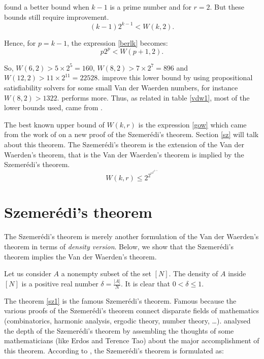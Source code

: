 \cite{brk1968} found a better bound when $k-1$ is a prime number  and for $r=2$. But these bounds still  require improvement. 
 \begin{equation}
 (k-1)2^{k-1}<W(k,2). \label{berlk}
 \end{equation}

Hence, for $p=k-1$, the expression \eqref{berlk} becomes:
 \begin{equation}
 p2^{p}<W(p+1,2). \label{berlk1}
\end{equation}

So, $W(6,2) >5 \times 2^5=160$, $W(8,2) >7 \times 2^7= 896$ and $W(12,2) >11 \times 2^11= 22528.$
\citep{dransfield2004} improve this lower bound by using propositional satisfiability solvers  for some small Van der Waerden numbers, for instance $W( 8,2) > 1322$. \cite{rabung2012} performs more. Thus, as related in table \eqref{vdw1}, most of the lower bounds used, came from \cite{rabung2012}.

The best known upper bound of $W(k,r)$ is the expression  \eqref{gow} which came from the work of \cite{gowers2001new} on a  new proof of the Szemerédi's theorem. Section \eqref{sz} will talk about this theorem. The  Szemerédi's theorem is the extension of the Van der Waerden's theorem, that is the Van der Waerden's theorem is implied by the  Szemerédi's theorem.
\begin{equation}
W(k,r) \leq 2^{2^{r^{2^{2^{k+9}}}}}     \label{gow}
\end{equation}

\section{Szemerédi's theorem} \label{sz}

The Szemerédi's theorem is merely another formulation of  the Van der Waerden's theorem in terms of \textit{density version}. Below, we show that the Szemerédi's theorem implies the Van der Waerden's theorem.

Let us consider $A$ a nonempty subset of the set $[N]$. The density of $A$ inside $[N]$ is a positive real number $\delta=\frac{|A|}{N}$. It is clear that $0< \delta \leq 1.$ 

The  theorem \eqref{sz1} is the famous Szemerédi’s theorem. Famous because the various proofs of the  Szemerédi's theorem connect disparate fields of mathematics (combinatorics, harmonic analysis, ergodic theory,  number theory, \ldots). \cite{arana2015depth} analysed the depth of the  Szemerédi's theorem by assembling the thoughts of some mathematicians (like Erdos and Terence Tao) about the major accomplishment of this theorem. According to \cite{polymath2012new}, the Szemerédi's theorem is formulated as:

